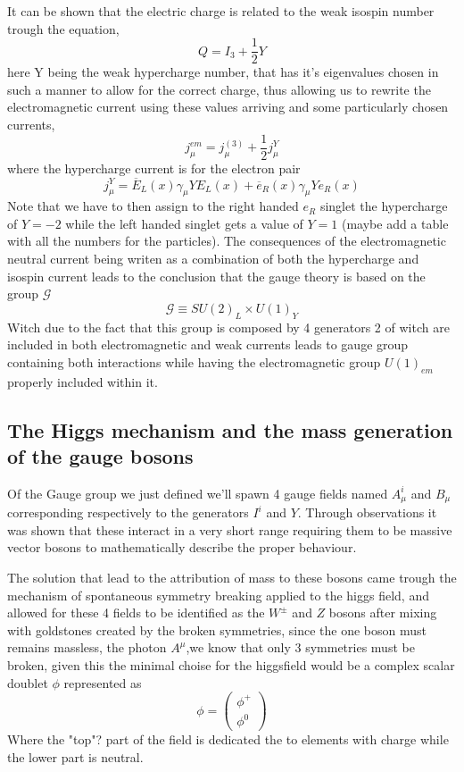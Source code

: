 \documentclass[11pt,twoside,a4paper]{article}
\begin{document}
It can be shown that the electric charge is related to the weak isospin number trough the equation, 
\begin{equation}
Q=I_3 + \frac{1}{2} Y
\end{equation} 
here Y being the weak hypercharge number, that has it's eigenvalues chosen in such a manner to allow for the correct charge, thus allowing us to rewrite the electromagnetic current using these values arriving and some particularly chosen currents, 
\begin{equation}
j^{em}_\mu = j^{(3)}_\mu + \frac{1}{2} j^Y_\mu
\end{equation}
where the hypercharge current is for the electron pair 
\begin{equation}
j^Y_\mu = \overline{E}_L (x) \gamma_\mu Y E_L (x) + \overline{e}_R (x) \gamma_\mu Y e_R (x)
\end{equation}
Note that we have to then assign to the right handed $e_R$ singlet the hypercharge of $Y=-2$ while the left handed singlet gets a value of $Y=1$ (maybe add a table with all the numbers for the particles). The consequences of the electromagnetic neutral current being writen as a combination of both the hypercharge and isospin current leads to the conclusion that the gauge theory is based on the group $\mathcal{G}$ 
\begin{equation}
\mathcal{G} \equiv SU(2)_L \times U(1)_Y
\end{equation}
Witch due to the fact that this group is composed by 4 generators 2 of witch are included in both electromagnetic and weak currents leads to gauge group containing both interactions while having the electromagnetic group $U(1)_{em}$ properly included within it.
 
\subsection{The Higgs mechanism and the mass generation of the gauge bosons}

Of the Gauge group we just defined we'll spawn 4 gauge fields named $A_\mu^i$ and $B_\mu$ corresponding respectively to the generators $I^i$ and $Y$. Through observations it was shown that these interact in a very short range requiring them to be massive vector bosons to mathematically describe the proper behaviour. 

The solution that lead to the attribution of mass to these bosons came trough the mechanism of spontaneous symmetry breaking applied to the higgs field, and allowed for these 4 fields to be identified as the $W^\pm$ and $Z$ bosons after mixing with goldstones created by the broken symmetries, since the one boson must remains massless, the photon $A^\mu$,we know that only 3 symmetries must be broken, given this the minimal choise for the higgsfield would be a complex scalar doublet $\phi$ represented as 
\begin{equation}
\phi = \left( \begin{matrix}
\phi^+ \\
\phi^0 
\end{matrix} \right)
\end{equation}
Where the "top"? part of the field is dedicated the to elements with charge while the lower part is neutral. 
\end{document}
